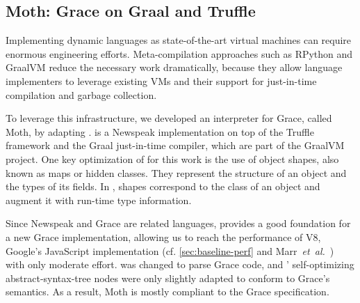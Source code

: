 
\subsection{Moth: Grace on Graal and Truffle}
\label{ssec:moth}

Implementing dynamic languages as state-of-the-art virtual machines
can require enormous engineering efforts.
Meta-compilation approaches\citep{Marr:2015:MTPE}
such as RPython\citep{Bolz:2009:TMP,Bolz:2013:IMT}
and GraalVM\citep{Wurthinger2013,Wurthinger:2017:PPE}
reduce the necessary work dramatically,
because they allow language implementers to leverage existing VMs
and their support for just-in-time compilation and garbage collection.

To leverage this infrastructure, we developed an interpreter for Grace,
called Moth\citep{Roberts2017}, by adapting \SOMns\citep{SOMns}.
\SOMns is a Newspeak implementation\citep{Bracha:10:NS} on top of the Truffle framework and the Graal just-in-time compiler,
which are part of the GraalVM project.
One key optimization of \SOMns for this work is the use of
object shapes\citep{woss2014object},
also known as maps\citep{Self} or hidden classes.
They represent the structure of an object and the types of its fields.
In \SOMns, shapes correspond to the class of an object and augment it with
run-time type information.

Since Newspeak and Grace are related languages,
\SOMns provides a good foundation for a new Grace implementation,
allowing us to reach the performance of V8,
Google's JavaScript implementation
(cf. \cref{sec:baseline-perf} and Marr~\textit{et~al.}~\cite{Marr2016})
with only moderate effort.
\SOMns was changed to parse Grace code, and 
\SOMns' self-optimizing abstract-syntax-tree nodes were only slightly adapted to conform to Grace's semantics.
As a result, Moth is mostly compliant to the Grace specification.


%

